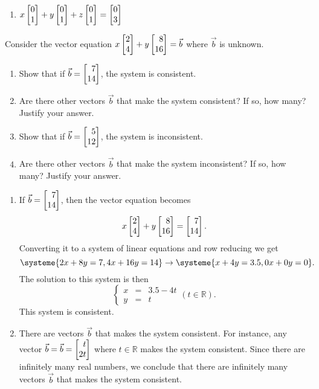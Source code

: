 \begin{exercises}
\begin{problist}
\begin{solution}
\begin{enumerate}
				\item $x\mat{0 \\ 1}+y\mat{0 \\ 1}+z\mat{0 \\ 1}=\mat
					{0 \\ 3}$
			\end{enumerate}
		\end{solution}

		\prob Consider the vector equation $x\mat{2 \\ 4}+y\mat{8 \\ 16}=\vec b$
		where $\vec b$ is unknown.
		\begin{enumerate}
			\item Show that if $\vec b=\mat{7 \\ 14}$, the system is consistent.

			\item Are there other vectors $\vec b$ that make the system consistent?
				If so, how many? Justify your answer.

			\item Show that if $\vec b=\mat{5 \\ 12}$, the system is
				inconsistent.

			\item Are there other vectors $\vec b$ that make the system inconsistent?
				If so, how many? Justify your answer.
		\end{enumerate}

		\begin{solution}
			\begin{enumerate}
				\item If $\vec b=\mat{7 \\ 14}$, then the vector equation
					becomes
					\[
						x\mat{2 \\ 4}+y\mat{8 \\ 16}=\mat{7 \\ 14}.
					\]
					Converting it to a system of linear equations and row
					reducing we get
					\[
						\systeme{2x+8y=7,4x+16y=14}\rightarrow \systeme{x+4y=3.5, 0x+0y=0}.
					\]
					The solution to this system is then
					\[
						\left\{
						\begin{array}
							{ccc} x & = & 3.5-4t \\ y & = & t
						\end{array}\right. (t\in \mathbb{R}).
					\]
					This system is consistent.

				\item There are vectors $\vec{b}$ that makes the system consistent.
					For instance, any vector $\vec b = \vec b=\mat{t \\ 2t}$ where
					$t\in\mathbb{R}$ makes the system consistent. Since there
					are infinitely many real numbers, we conclude that there are
					infinitely many vectors $\vec b$ that makes the system consistent.


\end{enumerate}
\end{solution}
\end{problist}
\end{exercises}
